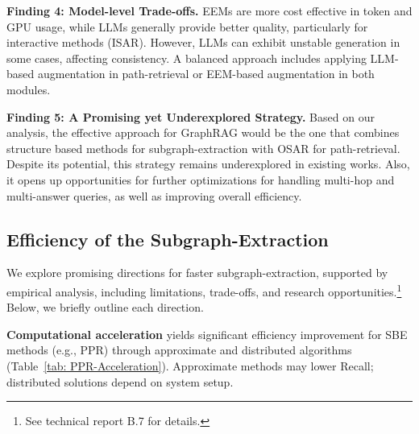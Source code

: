     \textbf{Finding 4: Model-level Trade-offs.} 
    EEMs are more cost effective in token and GPU usage, while LLMs generally provide better quality, particularly for interactive methods (ISAR). However, LLMs can exhibit unstable generation in some cases, affecting consistency. A balanced approach includes applying LLM-based augmentation in path-retrieval or EEM-based augmentation in both modules.

    \textbf{Finding 5: A Promising yet Underexplored Strategy.} Based on our analysis, the effective approach for GraphRAG would be the one that combines structure based methods for subgraph-extraction with OSAR for path-retrieval. Despite its potential, this strategy remains underexplored in existing works. Also, it opens up opportunities for further optimizations for handling multi-hop and multi-answer queries, as well as improving overall efficiency. 




\subsection{Efficiency  of the Subgraph-Extraction}
\label{subsec:eeSE}

We explore promising directions for faster subgraph-extraction, supported by empirical analysis, including limitations, trade-offs, and research opportunities.\footnote{See technical report B.7 for details.} Below, we briefly outline each direction.


{\bf Computational acceleration} yields significant efficiency improvement for SBE methods (e.g., PPR) through 
approximate and distributed algorithms (Table~\ref{tab: PPR-Acceleration}). 
Approximate methods may lower Recall; distributed solutions depend on system setup.


